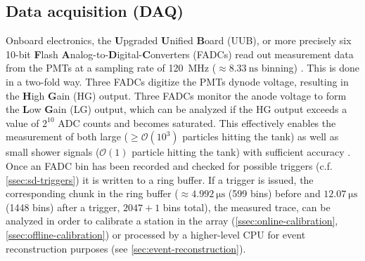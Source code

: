 \subsection{Data acquisition (DAQ)}
\label{ssec:sd-daq}

Onboard electronics, the \textbf{U}pgraded \textbf{U}nified \textbf{B}oard (UUB), or more precisely six 10-bit \textbf{F}lash 
\textbf{A}nalog-to-\textbf{D}igital-\textbf{C}onverters (FADCs) read out measurement data from the PMTs at a sampling rate of \SI{120}{\mega\hertz} 
($\approx\SI{8.33}{\nano\second}$ binning) \cite{verzi2013energy}. This is done in a two-fold way. Three FADCs digitize the PMTs dynode voltage, resulting in the
\textbf{H}igh \textbf{G}ain (HG) output. Three FADCs monitor the anode voltage to form the \textbf{L}ow \textbf{G}ain (LG) output, which can be analyzed if the 
HG output exceeds a value of $2^{10}$ ADC counts and becomes saturated. This effectively enables the measurement of both large ($\geq\mathcal{O}(10^3)$ particles
hitting the tank) as well as small shower signals ($\mathcal{O}(1)$ particle hitting the tank) with sufficient accuracy \cite{SDReconstruction}. Once an FADC bin 
has been recorded and checked for possible triggers (c.f. \autoref{ssec:sd-triggers}) it is written to a ring buffer. If a trigger is issued, the corresponding 
chunk in the ring buffer ($\approx\SI{4.992}{\micro\second}$ (599 bins) before and $\SI{12.07}{\micro\second}$ (1448 bins) after a trigger, $2047 + 1$ bins total),
the measured trace, can be analyzed in order to calibrate a station in the array (\autoref{ssec:online-calibration}, \autoref{ssec:offline-calibration}) or 
processed by a higher-level CPU for event reconstruction purposes (see \autoref{sec:event-reconstruction}).

